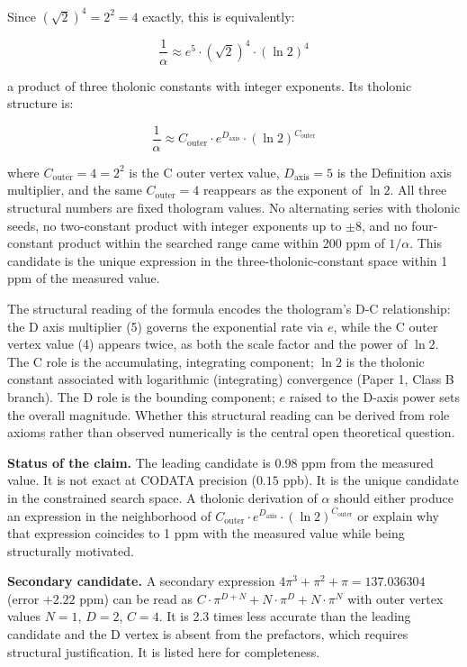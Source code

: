\documentclass[12pt]{article}
\begin{document}
Since \((\sqrt{2})^4 = 2^2 = 4\) exactly, this is equivalently:

\[\frac{1}{\alpha} \approx e^5 \cdot (\sqrt{2})^4 \cdot (\ln 2)^4\]

a product of three tholonic constants with integer exponents. Its
tholonic structure is:

\[\frac{1}{\alpha} \approx C_{\text{outer}} \cdot e^{D_{\text{axis}}} \cdot (\ln 2)^{C_{\text{outer}}}\]

where \(C_{\text{outer}} = 4 = 2^2\) is the C outer vertex value,
\(D_{\text{axis}} = 5\) is the Definition axis multiplier, and the same
\(C_{\text{outer}} = 4\) reappears as the exponent of \(\ln 2\). All
three structural numbers are fixed thologram values. No alternating
series with tholonic seeds, no two-constant product with integer
exponents up to \(\pm 8\), and no four-constant product within the
searched range came within 200 ppm of \(1/\alpha\). This candidate is
the unique expression in the three-tholonic-constant space within 1 ppm
of the measured value.

The structural reading of the formula encodes the thologram's D-C
relationship: the D axis multiplier (5) governs the exponential rate via
\(e\), while the C outer vertex value (4) appears twice, as both the
scale factor and the power of \(\ln 2\). The C role is the accumulating,
integrating component; \(\ln 2\) is the tholonic constant associated
with logarithmic (integrating) convergence (Paper 1, Class B branch).
The D role is the bounding component; \(e\) raised to the D-axis power
sets the overall magnitude. Whether this structural reading can be
derived from role axioms rather than observed numerically is the central
open theoretical question.

\textbf{Status of the claim.} The leading candidate is 0.98 ppm from the
measured value. It is not exact at CODATA precision (\(0.15\) ppb). It
is the unique candidate in the constrained search space. A tholonic
derivation of \(\alpha\) should either produce an expression in the
neighborhood of
\(C_{\text{outer}} \cdot e^{D_{\text{axis}}} \cdot (\ln 2)^{C_{\text{outer}}}\)
or explain why that expression coincides to 1 ppm with the measured
value while being structurally motivated.

\textbf{Secondary candidate.} A secondary expression
\(4\pi^3 + \pi^2 + \pi = 137.036304\) (error \(+2.22\) ppm) can be read
as \(C \cdot \pi^{D+N} + N \cdot \pi^D + N \cdot \pi^N\) with outer
vertex values \(N = 1\), \(D = 2\), \(C = 4\). It is 2.3 times less
accurate than the leading candidate and the D vertex is absent from the
prefactors, which requires structural justification. It is listed here
for completeness.
\end{document}
